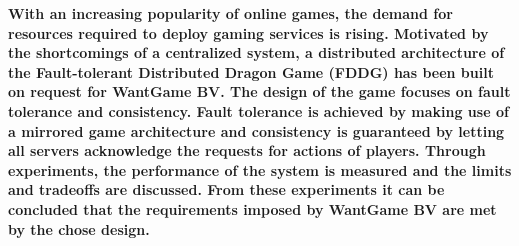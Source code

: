 \textbf{With an increasing popularity of online games, the demand for resources required to deploy gaming services is rising.
	Motivated by the shortcomings of a centralized system, a distributed architecture of the Fault-tolerant Distributed Dragon Game (FDDG) has been built on request for WantGame BV. 
	The design of the game focuses on fault tolerance and consistency.
	Fault tolerance is achieved by making use of a mirrored game architecture and consistency is guaranteed by letting all servers acknowledge the requests for actions of players. 
	Through experiments, the performance of the system is measured and the limits and tradeoffs are discussed.
	From these experiments it can be concluded that the requirements imposed by WantGame BV are met by the chose design.}